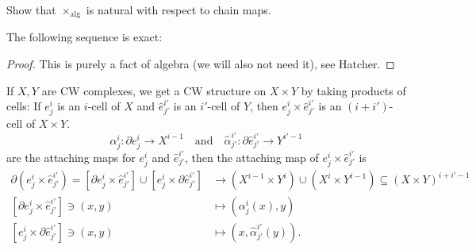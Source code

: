 \begin{exercise}
  Show that $\times_{\mathrm{alg}}$ is natural
  with respect to chain maps.
\end{exercise}

\begin{theorem}
  The following sequence is exact:
  \begin{center}
  \end{center}
\end{theorem}

\begin{proof}
  This is purely a fact of algebra (we will
  also not need it), see Hatcher.
\end{proof}

\begin{remark}
  If $X, Y$ are CW complexes, we get a CW structure
  on $X \times Y$ by taking products of cells: If
  $e^i_j$ is an $i$-cell of $X$ and
  $\widehat{e}_{j'}^{i'}$ is an $i'$-cell of $Y$,
  then $e^i_j \times \widehat{e}^{i'}_{j'}$
  is an $(i + i')$-cell of $X \times Y$.
  \[
    \alpha^i_j : \partial e^i_j \to X^{i - 1}
    \quad \text{and} \quad
    \widehat{\alpha}^{i'}_{j'} : \partial \widehat{e}^{i'}_{j'} \to Y^{i' - 1}
  \]
  are the attaching maps for
  $e^i_j$ and $\widehat{e}^{i'}_{j'}$,
  then the attaching map of $e^i_j \times \widehat{e}^{i'}_{j'}$
  is
  \begin{align*}
    \partial(e^i_j \times \widehat{e}^{i'}_{j'})
    = [\partial e^i_j \times \widehat{e}^{i'}_{j'}] \cup [e^i_j \times \partial \widehat{e}^{i'}_{j'}]
    &\longrightarrow
    (X^{i - 1} \times Y^i) \cup (X^i \times Y^{i - 1})
    \subseteq (X \times Y)^{i + i' - 1} \\
    [\partial e^i_j \times \widehat{e}^{i'}_{j'}] \ni (x, y)
    &\longmapsto (\alpha^i_j(x), y) \\
    [e^i_j \times \partial \widehat{e}^{i'}_{j'}] \ni (x, y)
    &\longmapsto (x, \widehat{\alpha}^{i'}_{j'}(y)).
  \end{align*}
\end{remark}

